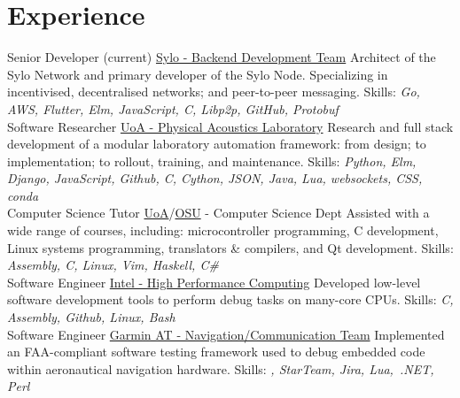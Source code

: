 \documentclass[a4paper]{twentysecondcv}
\begin{document}
\makeprofile{}

\section{Experience}
\begin{twenty}
           {}
           {Senior Developer (current)}
           {\href{https://sylo.io/}{Sylo - Backend Development Team}}
           {}
           {Architect of the Sylo Network and primary developer of the Sylo Node.
           Specializing in incentivised, decentralised networks; and peer-to-peer messaging.
           Skills: \emph{Go, AWS, Flutter, Elm, JavaScript, C, Libp2p, GitHub,
           Protobuf}} \\

           {}
           {Software Researcher}
           {\href{https://pal.auckland.ac.nz/}{UoA - Physical Acoustics Laboratory}}
           {}
           {Research and full stack development of a modular laboratory automation
           framework: from design; to implementation; to rollout, training, and
           maintenance.
           Skills: \emph{Python, Elm, Django, JavaScript, Github, C, Cython, JSON,
           Java, Lua, websockets, CSS, conda}} \\

           {}
           {Computer Science Tutor}
           {\href{http://www.auckland.ac.nz/}{UoA}/\href{http://www.oregonstate.edu/}{OSU} - Computer Science Dept}
           {}
           {Assisted with a wide range of courses, including: microcontroller
           programming, C development, Linux systems programming, translators
           \& compilers, and Qt development.
           Skills: \emph{Assembly, C, Linux, Vim, Haskell, C\#}} \\

           {}
           {Software Engineer}
           {\href{https://www.intel.com}{Intel - High Performance Computing}}
           {}
           {Developed low-level software development tools to perform debug
           tasks on many-core CPUs.
           Skills: \emph{C, Assembly, Github, Linux, Bash}} \\

           {}
           {Software Engineer}
           {\href{http://www.garmin.com}{Garmin AT - Navigation/Communication Team}}
           {}
           {Implemented an FAA-compliant software testing framework used to
           debug embedded code within aeronautical navigation hardware.
           Skills: \emph{\CC, StarTeam, Jira, Lua,~.NET, Perl}} \\


\end{twenty}
\end{document}

